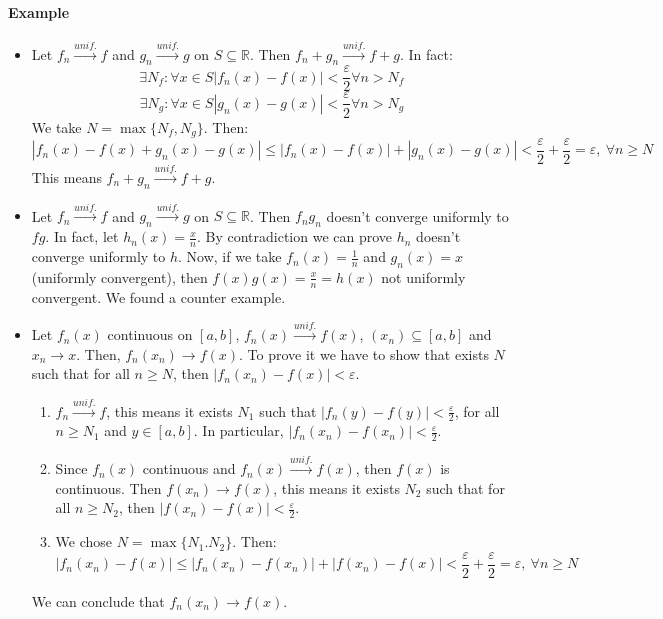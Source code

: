 \documentclass{article}
\newcommand{\abs}[1]{\left|#1\right|}
\newcommand{\tounif}{\xrightarrow{unif.}}
\newcommand{\intcc}[1]{\left[#1\right]}
\newcommand{\R}{\mathbb{R}}
\newcommand{\Ep}{\varepsilon}
\newcommand{\Example}{\paragraph{Example}}
\begin{document}
	\Example
\begin{itemize}
	\item %
	Let $f_n \tounif f$ and $g_n \tounif g$ on $S \subseteq \R$. Then $f_n + g_n
	\tounif f + g$. In fact:
\begin{equation*}
	\exists N_f : \forall x \in S \abs{f_n(x) - f(x)} < \frac{\Ep}{2} \forall n > N_f
\end{equation*}
\begin{equation*}
	\exists N_g : \forall x \in S \abs{g_n(x) - g(x)} < \frac{\Ep}{2} \forall n > N_g
\end{equation*}
	We take $N = \max \{ N_f, N_g \}$. Then:
\begin{equation*}
	\abs{f_n(x) - f(x) + g_n(x) - g(x)} \leq \abs{f_n(x) - f(x)} + \abs{g_n(x) -
	g(x)} < \frac{\Ep}{2} + \frac{\Ep}{2} = \Ep, \ \forall n \geq N
\end{equation*}
	This means $f_n + g_n \tounif f + g$.

	\item %
	Let $f_n \tounif f$ and $g_n \tounif g$ on $S \subseteq \R$. Then $f_n g_n$
	doesn't converge uniformly to $fg$. In fact, let $h_n(x) = \frac{x}{n}$.
	By contradiction we can prove $h_n$ doesn't converge uniformly to $h$. Now,
	if we take $f_n(x) = \frac{1}{n}$ and $g_n(x) = x$ (uniformly convergent),
	then $f(x) g(x) = \frac{x}{n} = h(x)$ not uniformly convergent. We found a
	counter example.

	\item %
	Let $f_n(x)$ continuous on $\intcc{a,b}$, $f_n(x) \tounif f(x)$, $(x_n)
	\subseteq \intcc{a,b}$ and $x_n \to x$. Then, $f_n(x_n) \to f(x)$. To prove it
	we have to show that exists $N$ such that for all $n \geq N$, then
	$\abs{f_n(x_n) - f(x)} < \Ep$.
	\begin{enumerate}
		\item $f_n \tounif f$, this means it exists $N_1$ such that $\abs{f_n(y) -
		f(y)} < \frac{\Ep}{2}$, for all $n \geq N_1$ and $y \in \intcc{a,b}$. In
		particular, $\abs{f_n(x_n) - f(x_n)} < \frac{\Ep}{2}$.

		\item Since $f_n(x)$ continuous and $f_n(x) \tounif f(x)$, then $f(x)$ is
		continuous. Then $f(x_n) \to f(x)$, this means it exists $N_2$ such that
		for all $n \geq N_2$, then $\abs{f(x_n) - f(x)} < \frac{\Ep}{2}$.

		\item We chose $N = \max \{ N_1. N_2 \}$. Then:
		\begin{equation*}
			\abs{f_n(x_n) - f(x)} \leq \abs{f_n(x_n) - f(x_n)} + \abs{f(x_n) - f(x)} <
			\frac{\Ep}{2} + \frac{\Ep}{2} = \Ep, \ \forall n \geq N
		\end{equation*}
	\end{enumerate}
	We can conclude that $f_n(x_n) \to f(x)$.
\end{itemize}
\end{document}
